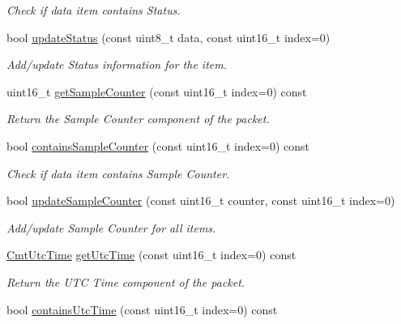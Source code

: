 \begin{DoxyCompactItemize}
\begin{DoxyCompactList}\small\item\em \-Check if data item contains \-Status. \end{DoxyCompactList}\item 
\hypertarget{classxsens_1_1Packet_afd499ad9bd835cf91fa958a558f23af0}{bool \hyperlink{classxsens_1_1Packet_afd499ad9bd835cf91fa958a558f23af0}{update\-Status} (const uint8\-\_\-t data, const uint16\-\_\-t index=0)}\label{classxsens_1_1Packet_afd499ad9bd835cf91fa958a558f23af0}

\begin{DoxyCompactList}\small\item\em \-Add/update \-Status information for the item. \end{DoxyCompactList}\item 
uint16\-\_\-t \hyperlink{classxsens_1_1Packet_a22a541365a87decf79c7715e06fb50fc}{get\-Sample\-Counter} (const uint16\-\_\-t index=0) const 
\begin{DoxyCompactList}\small\item\em \-Return the \-Sample \-Counter component of the packet. \end{DoxyCompactList}\item 
\hypertarget{classxsens_1_1Packet_aaf3b2aaf21ab144e182c8b3406df0edf}{bool \hyperlink{classxsens_1_1Packet_aaf3b2aaf21ab144e182c8b3406df0edf}{contains\-Sample\-Counter} (const uint16\-\_\-t index=0) const }\label{classxsens_1_1Packet_aaf3b2aaf21ab144e182c8b3406df0edf}

\begin{DoxyCompactList}\small\item\em \-Check if data item contains \-Sample \-Counter. \end{DoxyCompactList}\item 
\hypertarget{classxsens_1_1Packet_a2c0cb42c013cb29c3d811e664570f3b2}{bool \hyperlink{classxsens_1_1Packet_a2c0cb42c013cb29c3d811e664570f3b2}{update\-Sample\-Counter} (const uint16\-\_\-t counter, const uint16\-\_\-t index=0)}\label{classxsens_1_1Packet_a2c0cb42c013cb29c3d811e664570f3b2}

\begin{DoxyCompactList}\small\item\em \-Add/update \-Sample \-Counter for all items. \end{DoxyCompactList}\item 
\hyperlink{structCmtUtcTime}{\-Cmt\-Utc\-Time} \hyperlink{classxsens_1_1Packet_a5b67c2946400e4fb1c7506f7d031de68}{get\-Utc\-Time} (const uint16\-\_\-t index=0) const 
\begin{DoxyCompactList}\small\item\em \-Return the \-U\-T\-C \-Time component of the packet. \end{DoxyCompactList}\item 
\hypertarget{classxsens_1_1Packet_a28d53d5969ead11c4313dde53d5fc762}{bool \hyperlink{classxsens_1_1Packet_a28d53d5969ead11c4313dde53d5fc762}{contains\-Utc\-Time} (const uint16\-\_\-t index=0) const }\label{classxsens_1_1Packet_a28d53d5969ead11c4313dde53d5fc762}


\end{DoxyCompactItemize}

